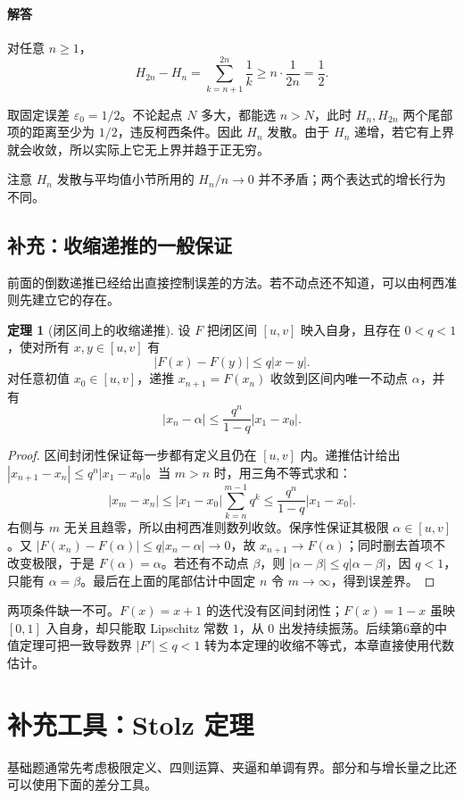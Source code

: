 \documentclass[UTF8,fontset=fandol,12pt,oneside,openany]{ctexrep}
\theoremstyle{definition}
\newtheorem{theorem}{定理}[chapter]
\begin{document}
\paragraph{解答} 对任意 $n\ge1$，
\[
H_{2n}-H_n=\sum_{k=n+1}^{2n}\frac1k\ge n\cdot\frac1{2n}=\frac12.
\]

取固定误差 $\varepsilon_0=1/2$。不论起点 $N$ 多大，都能选 $n>N$，此时 $H_n,H_{2n}$ 两个尾部项的距离至少为 $1/2$，违反柯西条件。因此 $H_n$ 发散。由于 $H_n$ 递增，若它有上界就会收敛，所以实际上它无上界并趋于正无穷。

注意 $H_n$ 发散与平均值小节所用的 $H_n/n\to0$ 并不矛盾；两个表达式的增长行为不同。

\subsection{补充：收缩递推的一般保证}

前面的倒数递推已经给出直接控制误差的方法。若不动点还不知道，可以由柯西准则先建立它的存在。

\begin{theorem}[闭区间上的收缩递推]
设 $F$ 把闭区间 $[u,v]$ 映入自身，且存在 $0<q<1$，使对所有 $x,y\in[u,v]$ 有
\[
|F(x)-F(y)|\le q|x-y|.
\]
对任意初值 $x_0\in[u,v]$，递推 $x_{n+1}=F(x_n)$ 收敛到区间内唯一不动点 $\alpha$，并有
\[
|x_n-\alpha|\le\frac{q^n}{1-q}|x_1-x_0|.
\]
\end{theorem}
\begin{proof}
区间封闭性保证每一步都有定义且仍在 $[u,v]$ 内。递推估计给出
$|x_{n+1}-x_n|\le q^n|x_1-x_0|$。当 $m>n$ 时，用三角不等式求和：
\[
|x_m-x_n|\le |x_1-x_0|\sum_{k=n}^{m-1}q^k
\le\frac{q^n}{1-q}|x_1-x_0|.
\]
右侧与 $m$ 无关且趋零，所以由柯西准则数列收敛。保序性保证其极限 $\alpha\in[u,v]$。又
$|F(x_n)-F(\alpha)|\le q|x_n-\alpha|\to0$，故 $x_{n+1}\to F(\alpha)$；同时删去首项不改变极限，于是 $F(\alpha)=\alpha$。若还有不动点 $\beta$，则
$|\alpha-\beta|\le q|\alpha-\beta|$，因 $q<1$，只能有 $\alpha=\beta$。最后在上面的尾部估计中固定 $n$ 令 $m\to\infty$，得到误差界。
\end{proof}
两项条件缺一不可。$F(x)=x+1$ 的迭代没有区间封闭性；$F(x)=1-x$ 虽映 $[0,1]$ 入自身，却只能取 Lipschitz 常数 $1$，从 $0$ 出发持续振荡。后续第6章的中值定理可把一致导数界 $|F'|\le q<1$ 转为本定理的收缩不等式，本章直接使用代数估计。

\section{补充工具：Stolz 定理}

基础题通常先考虑极限定义、四则运算、夹逼和单调有界。部分和与增长量之比还可以使用下面的差分工具。
\end{document}
